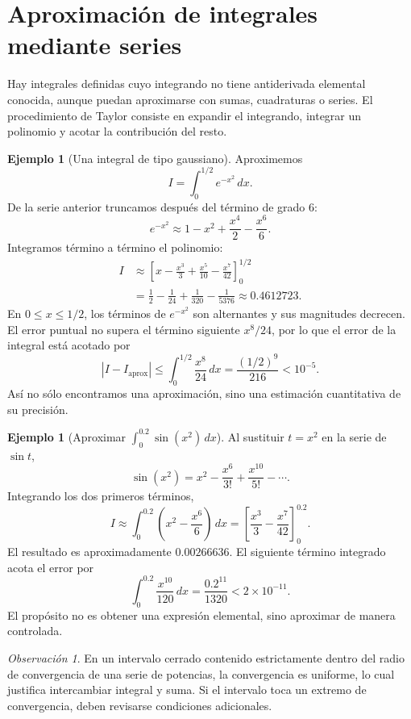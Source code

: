 \documentclass[12pt]{article}
\theoremstyle{definition}
\newtheorem{ejemplo}[teorema]{Ejemplo}
\theoremstyle{remark}
\newtheorem*{observacion}{Observación}
\newcommand{\dd}{\,dx}
\begin{document}
\section{Aproximación de integrales mediante series}
Hay integrales definidas cuyo integrando no tiene antiderivada elemental conocida, aunque puedan aproximarse con sumas, cuadraturas o series. El procedimiento de Taylor consiste en expandir el integrando, integrar un polinomio y acotar la contribución del resto.
\begin{ejemplo}[Una integral de tipo gaussiano]
Aproximemos
\[I=\int_0^{1/2}e^{-x^2}\dd.\]
De la serie anterior truncamos después del término de grado $6$:
\[e^{-x^2}\approx1-x^2+\frac{x^4}{2}-\frac{x^6}{6}.\]
Integramos término a término el polinomio:
\begin{align*}
I&\approx\left[x-\frac{x^3}{3}+\frac{x^5}{10}-\frac{x^7}{42}\right]_0^{1/2}\\
&=\frac12-\frac1{24}+\frac1{320}-\frac1{5376}
\approx\boxed{0.4612723}.
\end{align*}
En $0\le x\le1/2$, los términos de $e^{-x^2}$ son alternantes y sus magnitudes decrecen. El error puntual no supera el término siguiente $x^8/24$, por lo que el error de la integral está acotado por
\[|I-I_{\mathrm{aprox}}|\le\int_0^{1/2}\frac{x^8}{24}\dd
=\boxed{\frac{(1/2)^9}{216}<10^{-5}}.\]
Así no sólo encontramos una aproximación, sino una estimación cuantitativa de su precisión.
\end{ejemplo}
\begin{ejemplo}[Aproximar $\int_0^{0.2}\sin(x^2)\dd$]
Al sustituir $t=x^2$ en la serie de $\sin t$,
\[\sin(x^2)=x^2-\frac{x^6}{3!}+\frac{x^{10}}{5!}-\cdots.\]
Integrando los dos primeros términos,
\[I\approx\int_0^{0.2}\left(x^2-\frac{x^6}{6}\right)\dd
=\left[\frac{x^3}{3}-\frac{x^7}{42}\right]_0^{0.2}.\]
El resultado es aproximadamente $0.00266636$. El siguiente término integrado acota el error por
\[\int_0^{0.2}\frac{x^{10}}{120}\dd
=\frac{0.2^{11}}{1320}<2\times10^{-11}.\]
El propósito no es obtener una expresión elemental, sino aproximar de manera controlada.
\end{ejemplo}
\begin{observacion}
En un intervalo cerrado contenido estrictamente dentro del radio de convergencia de una serie de potencias, la convergencia es uniforme, lo cual justifica intercambiar integral y suma. Si el intervalo toca un extremo de convergencia, deben revisarse condiciones adicionales.
\end{observacion}
\end{document}
